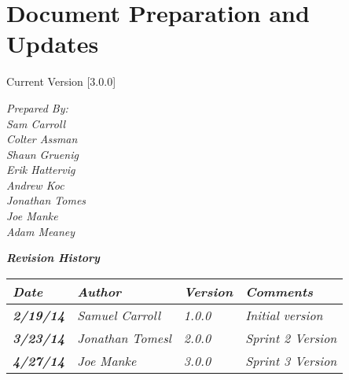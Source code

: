 
\chapter{Document Preparation and Updates}

Current Version [3.0.0]
\vspace*{5mm}

{\color{MSBlue3}
\noindent
\textit{Prepared By:}\\
\textit{Sam Carroll}\\
\textit{Colter Assman}\\
\textit{Shaun Gruenig}\\
\textit{Erik Hattervig}\\
\textit{Andrew Koc}\\
\textit{Jonathan Tomes}\\
\textit{Joe Manke}\\
\textit{Adam Meaney}\\
}

\vfill
\noindent
{\color{color02} \textit{\textbf{Revision History}}}\\
\begin{tabular}{|>{\raggedright}p{1.5cm}|>{\raggedright}p{3cm}|>{\raggedright}p{1.5cm}|>{\raggedright}p{9cm}|}
\hline
\textit{\textbf{Date}} &  \textit{\textbf{Author}} & \textit{\textbf{Version}} & \textit{\textbf{Comments}}\tabularnewline
\hline
 \textit{\textbf{2/19/14}} & \textit{Samuel Carroll} & \textit{1.0.0} & \textit{Initial version}\tabularnewline
\hline
 \textit{\textbf{3/23/14}} & \textit{Jonathan Tomesl} & \textit{2.0.0} & \textit{Sprint 2 Version}\tabularnewline
 \hline
 \textit{\textbf{4/27/14}} & \textit{Joe Manke} & \textit{3.0.0} & \textit{Sprint 3 Version}\tabularnewline
\hline
\end{tabular}
\vfill

